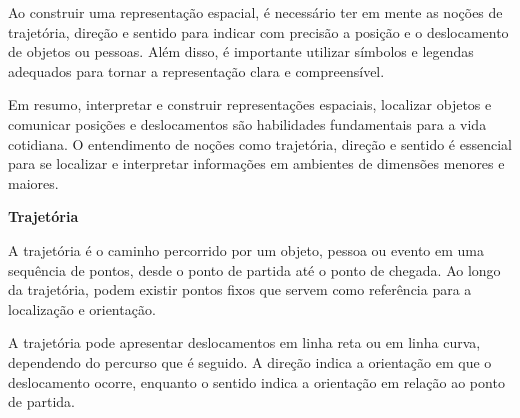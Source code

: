 \begin{escolha}
\begin{boxmedio}
\begin{boxmedio}
{\begin{boxpeq}
\begin{boxpeq}
{\begin{boxpeq}
\begin{boxmedio}
\begin{boxmedio}
\begin{boxpeq}
\begin{boxmedio}
\begin{boxpeq}
\begin{boxpeq}
\begin{boxpeq}
\begin{boxpeq}
\begin{boxmedio}
{\begin{boxmedio}
\begin{boxmedio}
\begin{boxpeq}
\begin{boxmedio}
\begin{boxpeq}
\begin{boxpeq}
\begin{boxpeq}
\begin{escolha}
{\begin{boxmedio}
\begin{boxpeq}
\begin{boxpeq}
\begin{boxpeq}
\begin{boxpeq}
\begin{boxpeq}
\begin{boxmedio}
\begin{boxpeq}
\begin{boxpeq}
\begin{boxpeq}
{\begin{boxpeq}
\begin{boxmedio}
\begin{boxpeq}
\begin{boxpeq}
\begin{boxpeq}
{\begin{boxpeq}
\begin{boxmedio}
{\begin{boxpeq}
\begin{boxpeq}
\begin{boxmedio}
\begin{boxmedio}
\begin{boxpeq}
\begin{boxpeq}
{\begin{boxpeq}
\begin{boxpeq}
\begin{boxpeq}
\begin{boxpeq}
\begin{boxpeq}
\begin{escolha}
\begin{escolha}
{\begin{boxmedio}
\begin{boxpeq}
\begin{q°}
\begin{boxmedio}
\begin{boxpeq}
\begin{boxpeq}
\begin{boxmedio}
\begin{boxmedio}
\begin{boxmedio}
{Ao construir uma representação espacial, é necessário ter em mente as
noções de trajetória, direção e sentido para indicar com precisão a
posição e o deslocamento de objetos ou pessoas. Além disso, é importante
utilizar símbolos e legendas adequados para tornar a representação clara
e compreensível.

Em resumo, interpretar e construir representações espaciais, localizar
objetos e comunicar posições e deslocamentos são habilidades
fundamentais para a vida cotidiana. O entendimento de noções como
trajetória, direção e sentido é essencial para se localizar e
interpretar informações em ambientes de dimensões menores e maiores.

\textbf{Trajetória}

A trajetória é o caminho percorrido por um objeto, pessoa ou evento em
uma sequência de pontos, desde o ponto de partida até o ponto de
chegada. Ao longo da trajetória, podem existir pontos fixos que servem
como referência para a localização e orientação.

A trajetória pode apresentar deslocamentos em linha reta ou em linha
curva, dependendo do percurso que é seguido. A direção indica a
orientação em que o deslocamento ocorre, enquanto o sentido indica a
orientação em relação ao ponto de partida.

}
\end{boxmedio}
\end{boxmedio}
\end{boxmedio}
\end{boxpeq}
\end{boxpeq}
\end{boxmedio}
\end{q°}
\end{boxpeq}
\end{boxmedio}}
\end{escolha}
\end{escolha}
\end{boxpeq}
\end{boxpeq}
\end{boxpeq}
\end{boxpeq}
\end{boxpeq}}
\end{boxpeq}
\end{boxpeq}
\end{boxmedio}
\end{boxmedio}
\end{boxpeq}
\end{boxpeq}}
\end{boxmedio}
\end{boxpeq}}
\end{boxpeq}
\end{boxpeq}
\end{boxpeq}
\end{boxmedio}
\end{boxpeq}}
\end{boxpeq}
\end{boxpeq}
\end{boxpeq}
\end{boxmedio}
\end{boxpeq}
\end{boxpeq}
\end{boxpeq}
\end{boxpeq}
\end{boxpeq}
\end{boxmedio}}
\end{escolha}
\end{boxpeq}
\end{boxpeq}
\end{boxpeq}
\end{boxmedio}
\end{boxpeq}
\end{boxmedio}
\end{boxmedio}}
\end{boxmedio}
\end{boxpeq}
\end{boxpeq}
\end{boxpeq}
\end{boxpeq}
\end{boxmedio}
\end{boxpeq}
\end{boxmedio}
\end{boxmedio}
\end{boxpeq}}
\end{boxpeq}
\end{boxpeq}}
\end{boxmedio}
\end{boxmedio}
\end{escolha}
